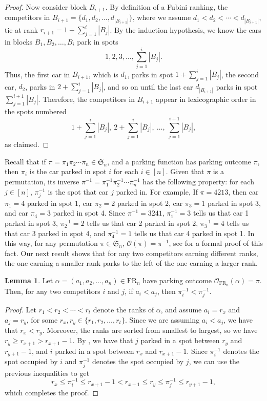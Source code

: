 \documentclass{amsart}
\theoremstyle{definition}
\newtheorem{lemma}{Lemma}[section]
\theoremstyle{definition}
\theoremstyle{remark}
\newcommand{\FR}[1]{\mathrm{FR}_{#1}}
\newcommand{\out}{\mathcal{O}}
\newcommand{\Sym}{\mathfrak{S}}
\begin{document}
\begin{proof}
Now consider block $B_{i+1}$. By definition of a Fubini ranking, the competitors in $B_{i+1}=\{d_1,d_2,\ldots,d_{|B_{i+1}|}\}$, where we assume $d_1<d_2<\cdots<d_{|B_{i+1}|}$,   tie at rank 
$r_{i+1}=1+\sum_{j=1}^{i}|B_j|$. 
By the induction hypothesis, we know the cars in blocks $B_1,B_2,\ldots,B_i$ park in spots 
\[1,2,3,\ldots,\sum_{j=1}^{i}|B_j|.\]
Thus, the first car in $B_{i+1}$, which is $d_1$, parks in spot $1+\sum_{j=1}^{i}|B_j|$, the second car, $d_2$, parks in  $2+\sum_{j=1}^{i}|B_j|$, and so on until the last car $d_{|B_{i+1}|}$ parks in spot $\sum_{j=1}^{i+1}|B_j|$.
Therefore, the competitors in $B_{i+1}$ appear in lexicographic order in the spots numbered 
    \[1 + \sum_{j=1}^{i} |B_j|,~2 + \sum_{j=1}^{i} |B_j|,~\ldots,~\sum_{j=1}^{i+1}|B_j|,
    \]
as claimed. 
\end{proof}
 
Recall that if $\pi=\pi_1\pi_2\cdots\pi_n\in\Sym_n$, and a parking function has parking outcome $\pi$, then $\pi_i$ is the car parked in spot $i$ for each $i\in[n]$.
Given that $\pi$ is a permutation, its inverse $\pi^{-1}=\pi_1^{-1}\pi_2^{-1}\cdots\pi_n^{-1}$ has the following property: for each $j\in[n]$, $\pi_j^{-1}$ is the spot that car $j$ parked in.
For example, If $\pi=4213$, then car $\pi_1=4$ parked in spot 1, car $\pi_2=2$ parked in spot 2, car $\pi_3=1$ parked in spot 3, and car $\pi_4=3$ parked in spot 4. 
Since $\pi^{-1}=3241$, 
$\pi_1^{-1}=3$ tells us that car 1 parked in spot 3,
$\pi_2^{-1}=2$ tells us that car 2 parked in spot 2,
$\pi_3^{-1}=4$ tells us that car 3 parked in spot 4, and 
$\pi_4^{-1}=1$ tells us that car 4 parked in spot 1. 
In this way, for any permutation $\pi \in \Sym_n$, $\out(\pi)=\pi^{-1}$, see \cite[Theorem 2.2]{MVP_PFs} for a formal proof of this fact.
Our next result shows that for any two competitors earning different ranks, the one earning a smaller rank parks to the left of the one earning a larger rank. 

\begin{lemma}\label{lem:lemma with lots of parts}
    Let $\alpha=(a_1,a_2,\ldots,a_n)\in\FR{n}$ have parking outcome $\out_{\FR{n}}(\alpha)=\pi$. 
    Then, for any two competitors $i $ and $j$, if $a_{i} < a_{j}$, then $\pi_{i}^{-1} < \pi_{j}^{-1}$.
\end{lemma}
\begin{proof}
        Let $r_1<r_2<\cdots<r_t$ denote the ranks of $\alpha$, and assume $a_{i} = r_{x}$ and  $a_{j} = r_{y}$, for some $r_{x},r_{y}\in\{r_1,r_2,\ldots,r_t\}$. 
        Since we are assuming $a_{i} < a_{j}$, we have that $r_{x} < r_{y}$. 
        Moreover, the ranks are sorted from smallest to largest, so we have $r_{y} \geq r_{x+1} > r_{x+1}-1$. 
        By , we have that $j$ parked in a spot between $r_{y}$ and $r_{y+1}-1$, and $i$ parked in a spot between $r_{x}$ and $r_{x+1}-1$. 
        Since $\pi_{i}^{-1}$ denotes the spot occupied by $i$ and $\pi_{j}^{-1}$ denotes the spot occupied by $j$, we can use the previous inequalities to  get 
        \[r_{x} \leq \pi_{i}^{-1} \leq r_{x+1}-1 < r_{x+1} \leq r_{y} \leq \pi_{j}^{-1} \leq r_{y+1}-1,\]
        which completes the proof.
\end{proof}
\end{document}
